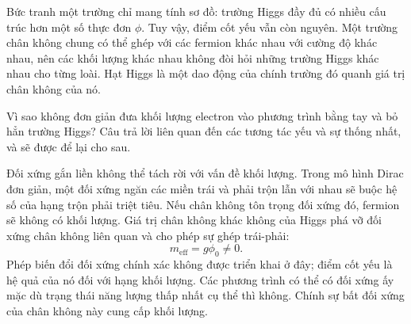 \begin{classroomqa}
\end{classroomqa}

Bức tranh một trường chỉ mang tính sơ đồ: trường Higgs đầy đủ có nhiều cấu trúc hơn một số thực đơn \(\phi\). Tuy vậy, điểm cốt yếu vẫn còn nguyên. Một trường chân không chung có thể ghép với các fermion khác nhau với cường độ khác nhau, nên các khối lượng khác nhau không đòi hỏi những trường Higgs khác nhau cho từng loài. Hạt Higgs là một dao động của chính trường đó quanh giá trị chân không của nó.

Vì sao không đơn giản đưa khối lượng electron vào phương trình bằng tay và bỏ hẳn trường Higgs? Câu trả lời liên quan đến các tương tác yếu và sự thống nhất, và sẽ được để lại cho sau.

\begin{classroomqa}
\end{classroomqa}

\begin{classroomqa}
\end{classroomqa}

Đối xứng gắn liền không thể tách rời với vấn đề khối lượng. Trong mô hình Dirac đơn giản, một đối xứng ngăn các miền trái và phải trộn lẫn với nhau sẽ buộc hệ số của hạng trộn phải triệt tiêu. Nếu chân không tôn trọng đối xứng đó, fermion sẽ không có khối lượng. Giá trị chân không khác không của Higgs phá vỡ đối xứng chân không liên quan và cho phép sự ghép trái-phải:
\begin{equation}
m_{\mathrm{eff}}=g\phi_0\neq0.
\end{equation}
Phép biến đổi đối xứng chính xác không được triển khai ở đây; điểm cốt yếu là hệ quả của nó đối với hạng khối lượng. Các phương trình có thể có đối xứng ấy mặc dù trạng thái năng lượng thấp nhất cụ thể thì không. Chính sự bất đối xứng của chân không này cung cấp khối lượng.


